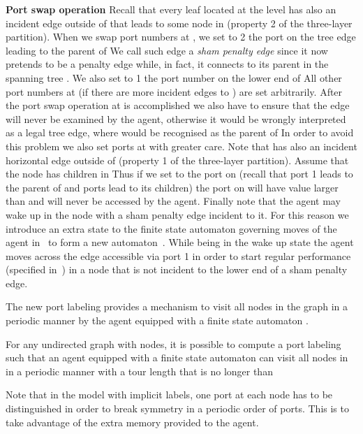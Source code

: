 \documentclass[11pt,envcountsame,oribibl]{llncs}
\begin{document}
\noindent
{\bf Port swap operation} Recall that every leaf  located at the
level  has also an incident edge  outside of  that leads to
some node  in 
(property 2 of the three-layer partition).
When we swap port numbers at , we set to 2 the port on the tree edge
leading to
the parent of  We call such edge a {\sl sham penalty edge} since it
now pretends
to be a penalty edge while, in fact, it connects  to its parent in
the spanning tree .
We also set to 1 the port number on the lower end of  All other port
numbers at 
(if there are more incident edges to ) are set arbitrarily.
After the port swap operation at  is accomplished we also have to ensure
that the edge
 will never be examined by the agent, otherwise it would be wrongly
interpreted as
a legal tree edge, where  would be recognised as the parent of 
In order to avoid this problem we also set ports at  with greater
care. Note that 
has also an incident horizontal edge  outside of 
(property 1 of
the three-layer partition). Assume that the node  has  children in
 Thus if we
set to  the port on  (recall that port 1 leads to the parent of  and
ports  lead
to its children) the port on  will have value larger than  and
 will never be accessed by the agent.
Finally note that the agent may wake up in the node with a sham penalty edge
incident to it.
For this reason we introduce an extra state to the finite state
automaton 
governing moves of the agent in~\cite{GKMNZ08} to form a new
automaton~.
While being in the wake up state the agent moves across the edge
accessible via port 1 in
order to start regular performance (specified in~\cite{GKMNZ08}) in a node
that is
not incident to the lower end of a sham penalty edge.


\begin{lemma}\label{l:newlabel}
The new port labeling provides a mechanism to visit all nodes in the graph
in a periodic manner
by the agent equipped with a finite state automaton .
\end{lemma}



\begin{theorem}\label{th:3.5n}
For any undirected graph  with  nodes, it is possible to compute
a port labeling such that
an agent equipped with a finite state automaton  can visit
all nodes in  in a periodic manner with a tour length that is no
longer than 
\end{theorem}


Note that in the model with implicit labels, one port at each node has
to be distinguished in order to break symmetry in a periodic order of ports. This is
to take advantage of the extra memory provided to the agent.
\end{document}
